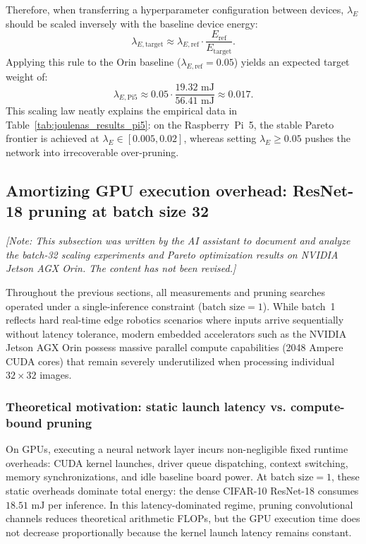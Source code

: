 \begin{enumerate}
    Therefore, when transferring a hyperparameter configuration between devices, $\lambda_E$ should be scaled inversely with the baseline device energy:
    \begin{equation}
    \lambda_{E, \text{target}} \approx \lambda_{E, \text{ref}} \cdot \frac{E_{\text{ref}}}{E_{\text{target}}}.
    \label{eq:cross_device_lambda_scaling}
    \end{equation}
    Applying this rule to the Orin baseline ($\lambda_{E, \text{ref}} = 0.05$) yields an expected target weight of:
    $$
    \lambda_{E, \text{Pi5}} \approx 0.05 \cdot \frac{19.32\text{ mJ}}{56.41\text{ mJ}} \approx 0.017.
    $$
    This scaling law neatly explains the empirical data in Table~\ref{tab:joulenas_results_pi5}: on the Raspberry~Pi~5, the stable Pareto frontier is achieved at $\lambda_E \in [0.005, 0.02]$, whereas setting $\lambda_E \ge 0.05$ pushes the network into irrecoverable over-pruning.
\end{enumerate}

\subsection{Amortizing GPU execution overhead: ResNet-18 pruning at batch size 32}
\label{sec:agxorin_bs32_experiments}

\noindent\textit{[Note: This subsection was written by the AI assistant to document and analyze the batch-32 scaling experiments and Pareto optimization results on NVIDIA Jetson AGX Orin. The content has not been revised.]}
\vspace{0.5em}

Throughout the previous sections, all measurements and pruning searches operated under a single-inference constraint ($\text{batch size} = 1$). While batch~1 reflects hard real-time edge robotics scenarios where inputs arrive sequentially without latency tolerance, modern embedded accelerators such as the NVIDIA Jetson AGX Orin possess massive parallel compute capabilities (2048 Ampere CUDA cores) that remain severely underutilized when processing individual $32 \times 32$ images.

\subsubsection{Theoretical motivation: static launch latency vs. compute-bound pruning}

On GPUs, executing a neural network layer incurs non-negligible fixed runtime overheads: CUDA kernel launches, driver queue dispatching, context switching, memory synchronizations, and idle baseline board power. At $\text{batch size} = 1$, these static overheads dominate total energy: the dense CIFAR-10 ResNet-18 consumes $18.51\text{ mJ}$ per inference. In this latency-dominated regime, pruning convolutional channels reduces theoretical arithmetic FLOPs, but the GPU execution time does not decrease proportionally because the kernel launch latency remains constant.

